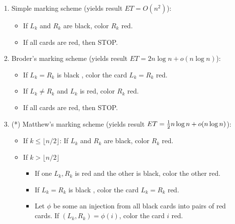 \documentclass[a4paper,12pt]{article}
\begin{document}
\begin{enumerate}
\item Simple marking scheme (yields result $ET=O(n^2)$):

\begin{itemize}
 \item If $L_k$ and $R_k$ are black, color $R_k$ red.
 \item If all cards are red, then STOP.
\end{itemize}



\item Broder's marking scheme (yields result $ET = 2n\log n +o(n\log n)$):

\begin{itemize}
 \item If $L_k=R_k$ is black , color the card $L_k=R_k$ red.
 \item If $L_k\neq R_k$ and $L_k$ is red, color $R_k$ red.
 \item If all cards are red, then STOP.
\end{itemize}




\item(*) Matthew's marking scheme (yields result $ET = {1\over 2}n\log n +o(n\log n)$):

\begin{itemize}
 \item If $k\leq \lfloor{n/2}\rfloor$: If $L_k$ and $R_k$ are black, color $R_k$ red.
 \item If $k>\lfloor{n/2}\rfloor$

\begin{itemize}
  \item If one $L_k, R_k$ is red and the other is black, color the other red.
  \item If $L_k=R_k$ is black , color the card $L_k=R_k$ red.
  \item Let $\phi$ be some an injection from all black cards into pairs of red cards.
  If $(L_k, R_k)=\phi(i)$, color the card $i$ red.
\end{itemize}

\end{itemize}






\end{enumerate}
\end{document}
